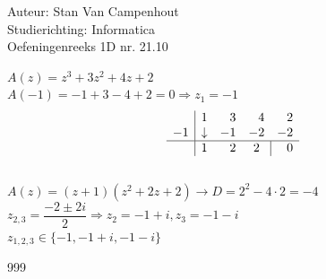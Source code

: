 \documentclass[a4paper]{article}
\begin{document}
  
\noindent \large Auteur: Stan Van Campenhout \\
\noindent \large Studierichting:  Informatica\\
\noindent \large Oefeningenreeks 1D nr. 21.10\\

\medskip

\normalsize

$ A(z) = z^3 + 3z^2 + 4z + 2 $\\

$ A(-1) = -1 + 3 -4 + 2 = 0 \Rightarrow z_{1} = -1 $\\

 \[ \begin{array}{c|rrrr}     
& 1 & 3 & 4 & 2 \\      
-1 & \downarrow  & -1  & -2    & -2   \\ \hline    
 & 1  & 2  &  \multicolumn{1}{c|}{2}  & 0   
\end{array} \] \\

$ A(z) = (z + 1)(z^2 + 2z + 2) \rightarrow D = 2^2 -4 \cdot 2 = -4 $\\

$ z_{2,3} = \dfrac{-2 \pm 2i}{2} \Rightarrow z_{2} = -1 + i, z_{3} = -1 - i $\\

$ z_{1,2,3} \in \{-1, -1 + i, -1 - i\} $\\

\begin{thebibliography}{999}
\end{thebibliography}
\end{document}
